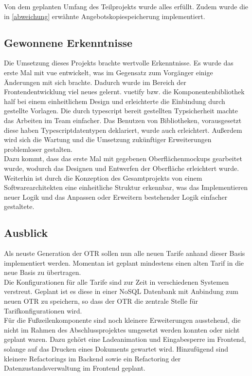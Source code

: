  Von dem geplanten Umfang des Teilprojekts wurde alles erfüllt. Zudem wurde die in \ref{abweichung}  erwähnte Angebotskopiespeicherung implementiert.
\subsection{Gewonnene Erkenntnisse}
\label{erkenntnisse}
Die Umsetzung dieses Projekts brachte wertvolle Erkenntnisse. Es wurde das erste Mal mit \gls{vue} entwickelt, was im Gegensatz zum Vorgänger einige Änderungen mit sich brachte. Dadurch wurde im Bereich der Frontendentwicklung viel neues gelernt. \gls{vuetify} bzw. die Komponentenbibliothek half bei einem einheitlichem Design und erleichterte die Einbindung durch gestellte Vorlagen. Die durch \gls{typescript} bereit gestellten Typsicherheit machte das Arbeiten im Team einfacher. Das Benutzen von Bibliotheken, vorausgesetzt diese haben Typescriptdatentypen deklariert, wurde auch erleichtert. Außerdem wird sich die Wartung und die Umsetzung zukünftiger Erweiterungen problemloser gestalten.\\ 
Dazu kommt, dass das erste Mal mit gegebenen Oberflächenmockups gearbeitet wurde, wodurch das Designen und Entwerfen der Oberfläche erleichtert wurde. Weiterhin ist durch die Konzeption des Gesamtprojekts von einem Softwarearchitekten eine einheitliche Struktur erkennbar, was das Implementieren neuer Logik und das Anpassen oder Erweitern bestehender Logik einfacher gestaltete.
\subsection{Ausblick}
\label{ausblick}
Als neuste Generation der \ac{OTR} sollen nun alle neuen Tarife anhand dieser Basis implementiert werden. Momentan ist geplant mindestens einen alten Tarif in die neue Basis zu übertragen.\\
Die Konfigurationen für alle Tarife sind zur Zeit in verschiedenen Systemen verstreut. Geplant ist es diese in einer NoSQL Datenbank mit Anbindung zum neuen \ac{OTR} zu speichern, so dass der \ac{OTR} die zentrale Stelle für Tarifkonfigurationen wird.\\
Für die Fußzeilenkomponente sind noch kleinere Erweiterungen ausstehend, die nicht im Rahmen des Abschlussprojektes umgesetzt werden konnten oder nicht geplant waren. Dazu gehört eine Ladeanimation und Eingabesperre im Frontend, solange auf das Drucken eines Dokuments gewartet wird. Hinzufügend sind kleinere Refactorings im Backend sowie ein Refactoring der Datenzustandsverwaltung im Frontend geplant.